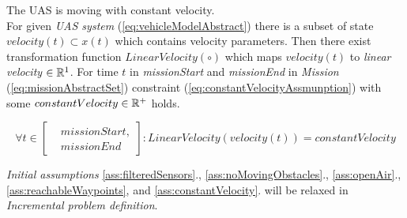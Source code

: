     \begin{assumption}
        {The UAS is moving with constant velocity}\label{ass:constantVelocity}.\\
        For given \emph{UAS system} (\ref{eq:vehicleModelAbstract}) there is a subset of state $velocity(t)\subset x(t)$ which contains velocity parameters. Then there exist transformation function $LinearVelocity(\circ)$ which maps $velocity(t)$  to \emph{linear velocity} $\in\mathbb{R}^1$. For time $t$ in \emph{missionStart} and \emph{missionEnd} in \emph{Mission} (\ref{eq:missionAbstractSet}) constraint (\ref{eq:constantVelocityAssmunption}) with some $constantVelocity \in \mathbb{R}^+$ holds.

        \begin{equation}\label{eq:constantVelocityAssmunption}
            \forall t \in \left[\begin{aligned}&missionStart,\\&missionEnd\end{aligned}\right]: LinearVelocity(velocity(t))=constantVelocity
        \end{equation}    
    \end{assumption}

    \begin{note}
        \emph{Initial assumptions} \ref{ass:filteredSensors}., \ref{ass:noMovingObstacles}., \ref{ass:openAir}., \ref{ass:reachableWaypoints}, and \ref{ass:constantVelocity}. will be relaxed in \emph{Incremental problem definition}.
    \end{note}
